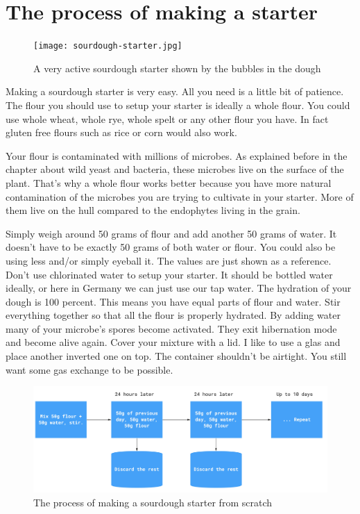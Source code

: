 \section{The process of making a starter}

\begin{figure}[!htb]
  \texttt{[image: sourdough-starter.jpg]}
  \caption{A very active sourdough starter shown by the bubbles in the dough}
  \label{fig:sourdough-starter}
\end{figure}

Making a sourdough starter is very easy. All you need
is a little bit of patience. The flour you should
use to setup your starter is ideally a whole flour.
You could use whole wheat, whole rye, whole spelt or
any other flour you have. In fact gluten free flours such
as rice or corn would also work.

Your flour is contaminated with millions of microbes. As explained
before in the chapter about wild yeast and bacteria, these
microbes live on the surface of the plant. That's why
a whole flour works better because you have more natural
contamination of the microbes you are trying to cultivate
in your starter. More of them live on the hull compared to the
endophytes living in the grain.

Simply weigh around 50 grams of flour and add another 50
grams of water. It doesn't have to be exactly 50 grams of both
water or flour. You could also be using less and/or simply eyeball
it. The values are just shown as a reference. Don't use chlorinated
water to setup your starter. It should be bottled water ideally,
or here in Germany we can just use our tap water. The hydration
of your dough is 100 percent. This means you have equal parts
of flour and water. Stir everything together so that all the flour
is properly hydrated. By adding water many of your microbe's
spores become activated. They exit hibernation mode and
become alive again. Cover your mixture with a lid. I like to
use a glas and place another inverted one on top. The container shouldn't
be airtight. You still want some gas exchange to be possible.

\begin{figure}[!htb]
  \includegraphics[width=\textwidth]{sourdough-starter-process.jpg}
  \caption{The process of making a sourdough starter from scratch}
  \label{fig:sourdough-starter-process}
\end{figure}


